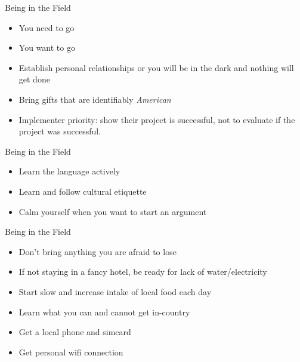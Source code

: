 \documentclass[
  ignorenonframetext,
]{beamer}
\providecommand{\tightlist}{%
  \setlength{\itemsep}{0pt}\setlength{\parskip}{0pt}}
\begin{document}
\begin{frame}{Being in the Field}
\protect\hypertarget{being-in-the-field}{}
\begin{itemize}
\tightlist
\item
  You need to go
\item
  You want to go
\item
  Establish personal relationships or you will be in the dark and
  nothing will get done
\item
  Bring gifts that are identifiably \emph{American}
\end{itemize}

\smallskip

\begin{itemize}
\tightlist
\item
  Implementer priority: show their project is successful, not to
  evaluate if the project was successful.
\end{itemize}

\end{frame}

\begin{frame}{Being in the Field}
\protect\hypertarget{being-in-the-field-1}{}
\begin{itemize}
\tightlist
\item
  Learn the language actively
\item
  Learn and follow cultural etiquette
\item
  Calm yourself when you want to start an argument
\end{itemize}
\end{frame}

\begin{frame}{Being in the Field}
\protect\hypertarget{being-in-the-field-2}{}
\begin{itemize}
\tightlist
\item
  Don't bring anything you are afraid to lose
\item
  If not staying in a fancy hotel, be ready for lack of
  water/electricity
\end{itemize}

\medskip

\begin{itemize}
\tightlist
\item
  Start slow and increase intake of local food each day
\item
  Learn what you can and cannot get in-country
\item
  Get a local phone and simcard
\item
  Get personal wifi connection
\end{itemize}
\end{frame}
\end{document}
